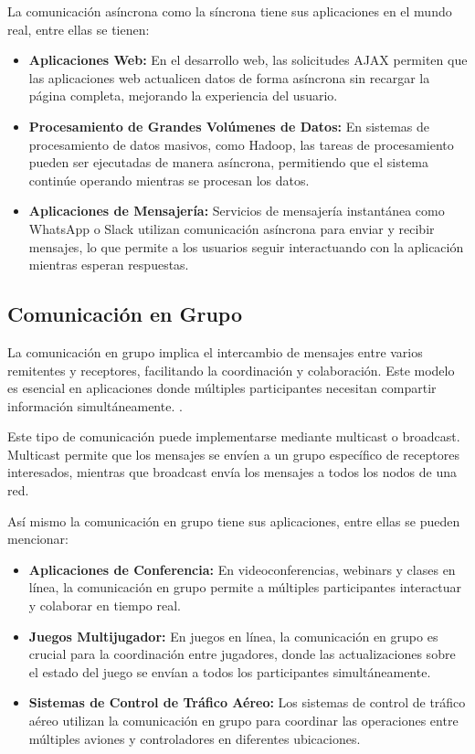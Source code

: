 			La comunicación asíncrona como la síncrona tiene sus aplicaciones en el mundo real, entre ellas se tienen:
			
			\begin{itemize}
				\item \textbf{Aplicaciones Web:} En el desarrollo web, las solicitudes AJAX permiten que las aplicaciones web actualicen datos de forma asíncrona sin recargar la página completa, mejorando la experiencia del usuario.
				\item \textbf{Procesamiento de Grandes Volúmenes de Datos:} En sistemas de procesamiento de datos masivos, como Hadoop, las tareas de procesamiento pueden ser ejecutadas de manera asíncrona, permitiendo que el sistema continúe operando mientras se procesan los datos.
				\item \textbf{Aplicaciones de Mensajería:} Servicios de mensajería instantánea como WhatsApp o Slack utilizan comunicación asíncrona para enviar y recibir mensajes, lo que permite a los usuarios seguir interactuando con la aplicación mientras esperan respuestas.
			\end{itemize}
		
		\subsection{Comunicación en Grupo}
			La comunicación en grupo implica el intercambio de mensajes entre varios remitentes y receptores, facilitando la coordinación y colaboración. Este modelo es esencial en aplicaciones donde múltiples participantes necesitan compartir información simultáneamente.
			 \cite{Hogie2023,Donta2022}.
		
			Este tipo de comunicación puede implementarse mediante multicast o broadcast. Multicast permite que los mensajes se envíen a un grupo específico de receptores interesados, mientras que broadcast envía los mensajes a todos los nodos de una red.
			
			Así mismo la comunicación en grupo tiene sus aplicaciones, entre ellas se pueden mencionar:
			
			\begin{itemize}
				\item \textbf{Aplicaciones de Conferencia:} En videoconferencias, webinars y clases en línea, la comunicación en grupo permite a múltiples participantes interactuar y colaborar en tiempo real.
				\item \textbf{Juegos Multijugador:} En juegos en línea, la comunicación en grupo es crucial para la coordinación entre jugadores, donde las actualizaciones sobre el estado del juego se envían a todos los participantes simultáneamente.
				\item \textbf{Sistemas de Control de Tráfico Aéreo:} Los sistemas de control de tráfico aéreo utilizan la comunicación en grupo para coordinar las operaciones entre múltiples aviones y controladores en diferentes ubicaciones.
			\end{itemize}
			
